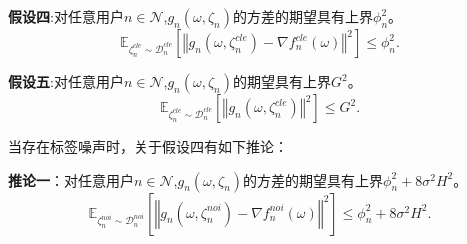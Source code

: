 \noindent \textbf{假设四}:对任意用户$n\in \mathcal{N}$,$g_n(\omega,\zeta_n)$的方差的期望具有上界$\phi_n^2$。
\begin{equation}\label{j4}
\mathbb{E}_{\zeta_n^{cle}\sim \mathcal{D}_n^{cle}}\left[\left\Vert g_n\left(\omega,\zeta_n^{cle}\right) - \nabla f_n^{cle}\left(\omega\right) \right\Vert^2 \right] \leq \phi_n^2.
\end{equation}

\noindent \textbf{假设五}:对任意用户$n\in \mathcal{N}$,$g_n(\omega,\zeta_n)$的期望具有上界$G^2$。
\begin{equation}\label{j5}
\mathbb{E}_{\zeta_n^{cle}\sim \mathcal{D}_n^{cle}}\left[\left\Vert g_n\left(\omega, \zeta_n^{cle}\right) \right\Vert^2\right] \leq G^2. 
\end{equation}

当存在标签噪声时，关于假设四有如下推论：

\noindent \textbf{推论一}：对任意用户$n\in \mathcal{N}$,$g_n(\omega,\zeta_n)$的方差的期望具有上界$\phi_n^2+8\sigma^2H^2$。
\begin{equation}\label{j6}
\mathbb{E}_{\zeta_n^{noi}\sim \mathcal{D}_n^{noi}}\left[\left\Vert g_n\left(\omega,\zeta_n^{noi}\right) - \nabla f_n^{noi}\left(\omega\right) \right\Vert^2 \right] \leq \phi_n^2+8\sigma^2H^2.
\end{equation}


